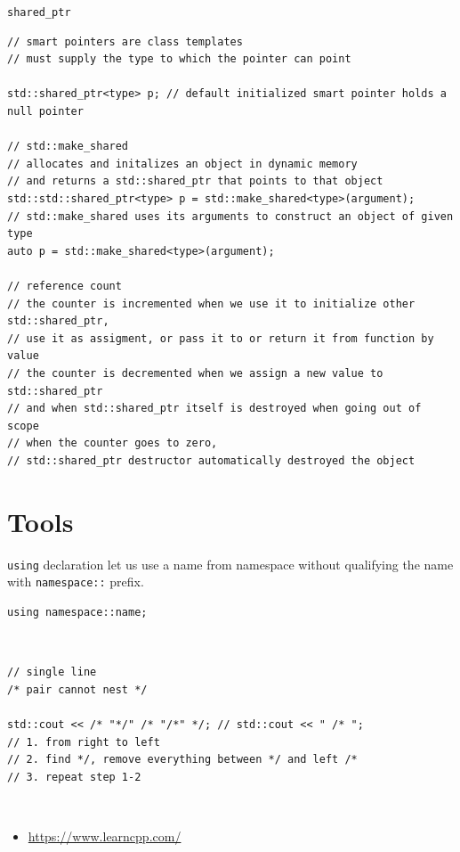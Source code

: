 \documentclass{blog}
\begin{document}
\begin{definition}
    \verb|shared_ptr|
    \begin{verbatim}
// smart pointers are class templates
// must supply the type to which the pointer can point

std::shared_ptr<type> p; // default initialized smart pointer holds a null pointer

// std::make_shared
// allocates and initalizes an object in dynamic memory
// and returns a std::shared_ptr that points to that object
std::std::shared_ptr<type> p = std::make_shared<type>(argument);
// std::make_shared uses its arguments to construct an object of given type
auto p = std::make_shared<type>(argument);

// reference count
// the counter is incremented when we use it to initialize other std::shared_ptr,
// use it as assigment, or pass it to or return it from function by value
// the counter is decremented when we assign a new value to std::shared_ptr
// and when std::shared_ptr itself is destroyed when going out of scope
// when the counter goes to zero,
// std::shared_ptr destructor automatically destroyed the object
\end{verbatim}
\end{definition}

\appendix
\section{Tools}
\begin{definition}[namespace]
    \verb|using| declaration let us use a name from namespace without qualifying the name with \verb|namespace::| prefix.
    \begin{verbatim}
using namespace::name;
\end{verbatim}
\end{definition}

\begin{definition}[comment]~
    \begin{verbatim}
// single line
/* pair cannot nest */

std::cout << /* "*/" /* "/*" */; // std::cout << " /* ";
// 1. from right to left
// 2. find */, remove everything between */ and left /*
// 3. repeat step 1-2
\end{verbatim}
\end{definition}

\begin{example}[resources]~
    \begin{itemize}
        \item \url{https://www.learncpp.com/}
    \end{itemize}
\end{example}

\printbibliography
\end{document}
